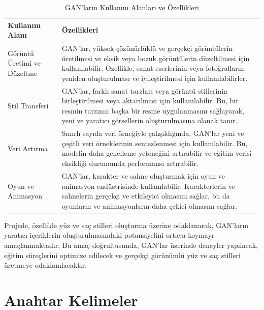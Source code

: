 \documentclass[12pt]{article}
\begin{document}
\begin{table}[htbp]
\centering
\captionsetup{justification=centering}
\caption{GAN'ların Kullanım Alanları ve Özellikleri}
\label{tab:gan-kullanim}
\begin{tabular}{|p{4.5cm}|p{9cm}|}
\hline
\textbf{Kullanım Alanı} & \textbf{Özellikleri} \\
\hline
Görüntü Üretimi ve Düzeltme & GAN'lar, yüksek çözünürlüklü ve gerçekçi görüntülerin üretilmesi ve eksik veya bozuk görüntülerin düzeltilmesi için kullanılabilir. Özellikle, sanat eserlerinin veya fotoğrafların yeniden oluşturulması ve iyileştirilmesi için kullanılabilirler. \\
\hline
Stil Transferi & GAN'lar, farklı sanat tarzları veya görüntü stillerinin birleştirilmesi veya aktarılması için kullanılabilir. Bu, bir resmin tarzının başka bir resme uygulanmasını sağlayarak, yeni ve yaratıcı görsellerin oluşturulmasına olanak tanır. \\
\hline
Veri Artırma & Sınırlı sayıda veri örneğiyle çalışıldığında, GAN'lar yeni ve çeşitli veri örneklerinin sentezlenmesi için kullanılabilir. Bu, modelin daha genelleme yeteneğini artırabilir ve eğitim verisi eksikliği durumunda performansı artırabilir. \\
\hline
Oyun ve Animasyon & GAN'lar, karakter ve sahne oluşturmak için oyun ve animasyon endüstrisinde kullanılabilir. Karakterlerin ve sahnelerin gerçekçi ve etkileyici olmasını sağlar, bu da oyunların ve animasyonların daha çekici olmasını sağlar. \\
\hline
\end{tabular}
\end{table}
Projede, özellikle yüz ve saç stilleri oluşturma üzerine odaklanarak, GAN'ların yaratıcı içeriklerin oluşturulmasındaki potansiyelini ortaya koymayı amaçlanmaktadır. Bu amaç doğrultusunda, GAN'lar üzerinde deneyler yapılacak, eğitim süreçlerini optimize edilecek ve gerçekçi görünümlü yüz ve saç stilleri üretmeye odaklanılacaktır.
\newpage
\section{Anahtar Kelimeler}
\end{document}
